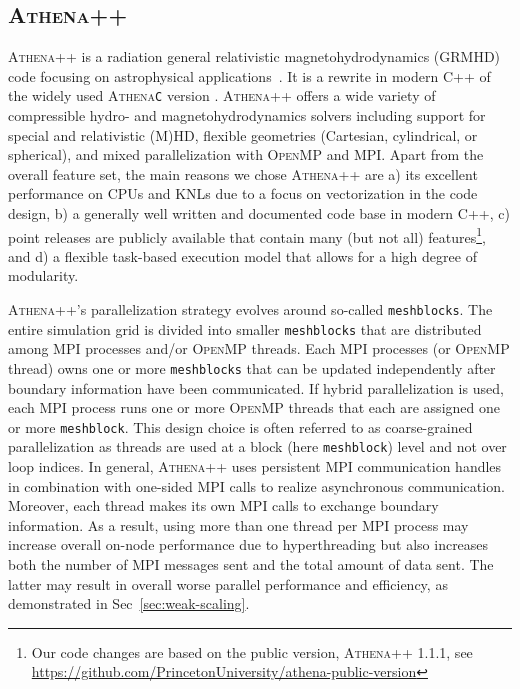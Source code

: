 \documentclass[10pt,journal,compsoc]{IEEEtran}
\newcommand{\textcode}[1]{\textsc{#1}}
\newcommand{\athena}{\textcode{Athena++}\xspace}
\newcommand{\athenaC}{\textcode{Athena}\xspace}
\newcommand{\openmp}{\textcode{OpenMP}\xspace}
\newcommand{\mpi}{\textcode{MPI}\xspace}
\newcommand{\cpp}{\textcode{C++}\xspace}
\begin{document}
\subsection{\athena}
\label{sec:athena}
\athena is a radiation general relativistic magnetohydrodynamics (GRMHD) code focusing on astrophysical 
applications~\cite{White2016,Stone2019}.
It is a rewrite in modern \cpp of the widely used \athenaC \texttt{C} version 
\cite{Stone2008}.
\athena offers a wide variety of compressible hydro- and magnetohydrodynamics solvers 
including support for special and relativistic (M)HD, 
flexible geometries (Cartesian, cylindrical, or spherical), and mixed parallelization
with \openmp and \mpi.
Apart from the overall feature set, the main reasons we chose \athena are 
a) its excellent performance on CPUs and KNLs due to a focus on vectorization
in the code design, 
b) a generally well written and documented code base in modern 
\cpp, 
c) point releases are publicly 
available that contain many (but not all) features\footnote{Our code
  changes are based on the public version, \athena 1.1.1, see
\url{https://github.com/PrincetonUniversity/athena-public-version}},
and
d) a flexible task-based execution model that allows for a high degree of modularity.

\athena's parallelization strategy evolves around so-called \texttt{meshblocks}.
The entire simulation grid is divided into smaller \texttt{meshblocks} that are distributed
among \mpi processes and/or \openmp threads.
Each \mpi processes (or \openmp thread) owns one or more \texttt{meshblocks} that can
be updated independently after boundary information have been communicated.
If hybrid parallelization is used, each \mpi process runs one or more \openmp threads that
each are assigned one or more \texttt{meshblock}.
This design choice is often referred to as coarse-grained parallelization as threads are used
at a block (here \texttt{meshblock}) level and not over loop indices.
In general, \athena uses persistent \mpi communication handles 
in combination with one-sided \mpi calls to realize asynchronous 
communication.
Moreover, each thread makes its own \mpi calls to exchange boundary information.
As a result, using more than one thread per \mpi process may increase overall on-node
performance due to hyperthreading but also increases both the number of \mpi messages sent and
the total amount of data sent.
The latter may result in overall worse parallel performance and efficiency, as
demonstrated in Sec~\ref{sec:weak-scaling}.
\end{document}
